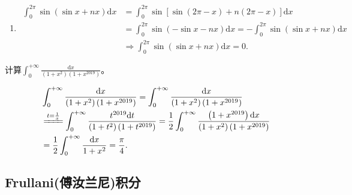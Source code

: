 \documentclass[../../main.tex]{subfiles}
\begin{document}
\begin{solution}
\begin{enumerate}
\item\begin{align*}
\int_0^{2\pi}{\sin \left( \sin x+nx \right) \mathrm{d}x}&=\int_0^{2\pi}{\sin \left[ \sin \left( 2\pi -x \right) +n\left( 2\pi -x \right) \right] \mathrm{d}x}
\\
&=\int_0^{2\pi}{\sin \left( -\sin x-nx \right) \mathrm{d}x}=-\int_0^{2\pi}{\sin \left( \sin x+nx \right) \mathrm{d}x}
\\
&\Longrightarrow \int_0^{2\pi}{\sin \left( \sin x+nx \right) \mathrm{d}x}=0.
\end{align*} 
\end{enumerate}
\end{solution}

\begin{example}
计算$\int_{0}^{+\infty} \frac{\mathrm{d}x}{\left(1 + x^2\right)\left(1 + x^{2019}\right)}$。
\end{example}
\begin{solution}
\begin{align*}
&\int_0^{+\infty}{\frac{\mathrm{d}x}{\left( 1+x^2 \right) \left( 1+x^{2019} \right)}}=\int_0^{+\infty}{\frac{\mathrm{d}x}{\left( 1+x^2 \right) \left( 1+x^{2019} \right)}}
\\
&\xlongequal{t=\frac{1}{x}}\int_0^{+\infty}{\frac{t^{2019}\mathrm{d}t}{\left( 1+t^2 \right) \left( 1+t^{2019} \right)}}=\frac{1}{2}\int_0^{+\infty}{\frac{\left( 1+x^{2019} \right) \mathrm{d}x}{\left( 1+x^2 \right) \left( 1+x^{2019} \right)}}
\\
&=\frac{1}{2}\int_0^{+\infty}{\frac{\mathrm{d}x}{1+x^2}}=\frac{\pi}{4}.
\end{align*}
\end{solution}




\subsection{Frullani(傅汝兰尼)积分}
\end{document}
